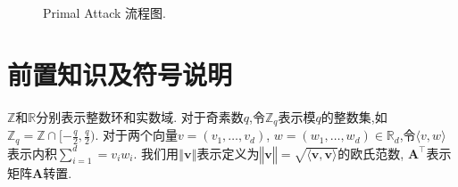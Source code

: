 \documentclass[12pt,a4paper]{article}
\newtheorem{definition}{定义} %
\numberwithin{equation}{section}
\begin{document}
\begin{figure}[htbp]
\begin{center}
\begin{tikzpicture}



\end{tikzpicture}
    
\end{center}
    \caption{Primal Attack 流程图.}
    \label{fig:flowchart}
\end{figure}




\section{前置知识及符号说明}
$\mathbb{Z}$和$\mathbb{R}$分别表示整数环和实数域.
对于奇素数$q$,令$\mathbb{Z}_q$表示模$q$的整数集,如$\mathbb{Z}_q = \mathbb{Z}\cap[-\frac{q}{2},\frac{q}{2})$.
对于两个向量$v =(v_1 , \ldots , v_d)$, $w = ( w_1 , \ldots , w_d) \in \mathbb{R}_d$,令$\langle v,w\rangle$表示内积$ \sum_{i=1}^{d}= v_iw_i$.
我们用$‖\mathbf{v}‖$表示定义为$‖\mathbf{v}‖=\sqrt{\langle\mathbf{v},\mathbf{v}\rangle}$的欧氏范数, $\mathbf{A}^\top$表示矩阵$\mathbf{A}$转置.



\end{document}

